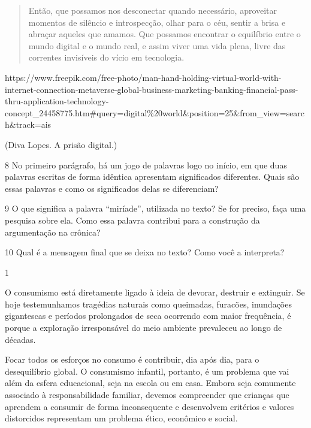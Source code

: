 {\begin{quote}
Então, que possamos nos desconectar quando necessário, aproveitar
momentos de silêncio e introspecção, olhar para o céu, sentir a brisa e
abraçar aqueles que amamos. Que possamos encontrar o equilíbrio entre o
mundo digital e o mundo real, e assim viver uma vida plena, livre das
correntes invisíveis do vício em tecnologia.
\end{quote}

https://www.freepik.com/free-photo/man-hand-holding-virtual-world-with-internet-connection-metaverse-global-business-marketing-banking-financial-pass-thru-application-technology-concept\_24458775.htm\#query=digital\%20world\&position=25\&from\_view=search\&track=ais

(Diva Lopes. A prisão digital.)

\num{8} No primeiro parágrafo, há um jogo de palavras logo no início, em
que duas palavras escritas de forma idêntica apresentam significados
diferentes. Quais são essas palavras e como os significados delas se
diferenciam?


\num{9} O que significa a palavra ``miríade'', utilizada no texto? Se
for preciso, faça uma pesquisa sobre ela. Como essa palavra contribui
para a construção da argumentação na crônica?


\num{10} Qual é a mensagem final que se deixa no texto? Como você a
interpreta?



\num{1}

O consumismo está diretamente ligado à ideia de devorar, destruir e
extinguir. Se hoje testemunhamos tragédias naturais como queimadas,
furacões, inundações gigantescas e períodos prolongados de seca
ocorrendo com maior frequência, é porque a exploração irresponsável do
meio ambiente prevaleceu ao longo de décadas.

Focar todos os esforços no consumo é contribuir, dia após dia, para o
desequilíbrio global. O consumismo infantil, portanto, é um problema que
vai além da esfera educacional, seja na escola ou em casa. Embora seja
comumente associado à responsabilidade familiar, devemos compreender que
crianças que aprendem a consumir de forma inconsequente e desenvolvem
critérios e valores distorcidos representam um problema ético, econômico
e social.

}
